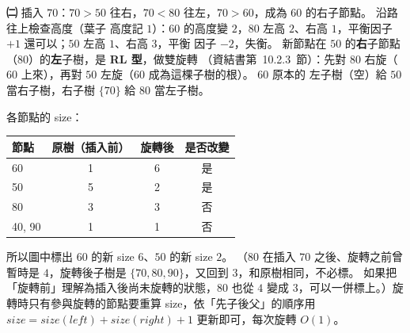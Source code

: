\begin{pastsoln}
\textbf{㈡} 插入 $70$：$70 > 50$ 往右，$70 < 80$ 往左，$70 > 60$，成為 $60$ 的右子節點。 沿路往上檢查高度（葉子
高度記 $1$）：$60$ 的高度變 $2$，$80$ 左高 $2$、右高 $1$，平衡因子 $+1$ 還可以；$50$ 左高 $1$、右高 $3$，平衡
因子 $-2$，失衡。 新節點在 $50$ 的\textbf{右}子節點（$80$）的\textbf{左}子樹，是 \textbf{RL 型}，做雙旋轉
（資結書第~10.2.3~節）：先對 $80$ 右旋（$60$ 上來），再對 $50$ 左旋（$60$ 成為這棵子樹的根）。 $60$ 原本的
左子樹（空）給 $50$ 當右子樹，右子樹 $\{70\}$ 給 $80$ 當左子樹。
\begin{center}
\end{center}
各節點的 size：
\begin{center}
\small
\begin{tabular}{lccc}
\toprule
節點 & 原樹（插入前） & 旋轉後 & 是否改變 \\
\midrule
60 & 1 & 6 & 是 \\
50 & 5 & 2 & 是 \\
80 & 3 & 3 & 否 \\
40, 90 & 1 & 1 & 否 \\
\bottomrule
\end{tabular}
\end{center}
所以圖中標出 $60$ 的新 size $6$、$50$ 的新 size $2$。 （$80$ 在插入 $70$ 之後、旋轉之前曾暫時是 $4$，旋轉後子樹是
$\{70, 80, 90\}$，又回到 $3$，和原樹相同，不必標。 如果把「旋轉前」理解為插入後尚未旋轉的狀態，$80$ 也從 $4$
變成 $3$，可以一併標上。）旋轉時只有參與旋轉的節點要重算 size，依「先子後父」的順序用
$\mathit{size} = \mathit{size}(\mathit{left}) + \mathit{size}(\mathit{right}) + 1$ 更新即可，每次旋轉 $O(1)$。
\end{pastsoln}
